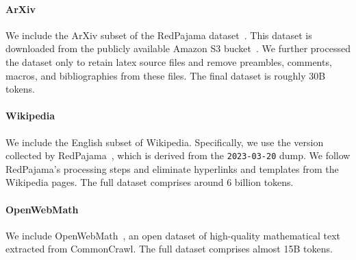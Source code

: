 \documentclass[10pt]{article} %
\begin{document}
\paragraph{ArXiv} We include the ArXiv subset of the RedPajama dataset~\citep{together2023redpajama}. This dataset is downloaded from the publicly available Amazon S3 bucket~\citep{arxiv_dump}. We further processed the dataset only to retain latex source files and remove preambles, comments, macros, and bibliographies from these files. The final dataset is roughly 30B tokens. 


\paragraph{Wikipedia} We include the English subset of Wikipedia. Specifically, we use the version collected by RedPajama~\citep{redpajama_wiki}, which is derived from the \verb|2023-03-20| dump. We follow RedPajama's processing steps and eliminate hyperlinks and templates from the Wikipedia pages. The full dataset comprises around 6 billion tokens. 

\paragraph{OpenWebMath} We include OpenWebMath~\citep{paster2023openwebmath}, an open dataset of high-quality mathematical text extracted from CommonCrawl. The full dataset comprises almost 15B tokens.  
\end{document}
